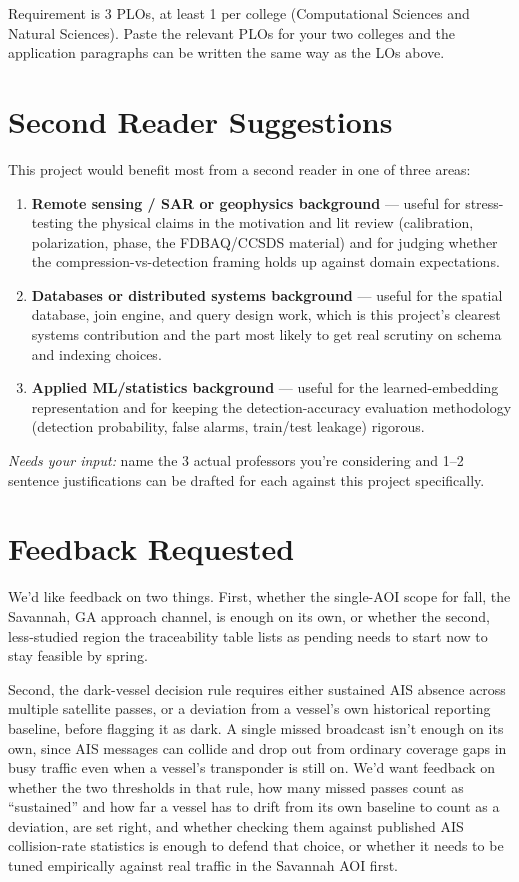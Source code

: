 \documentclass[11pt]{article}
\begin{document}
Requirement is 3 PLOs, at least 1 per college (Computational Sciences and Natural Sciences). Paste the relevant PLOs for your two colleges and the application paragraphs can be written the same way as the LOs above.

\section{Second Reader Suggestions}

This project would benefit most from a second reader in one of three areas:

\begin{enumerate}[leftmargin=*]
\item \textbf{Remote sensing / SAR or geophysics background} --- useful for stress-testing the physical claims in the motivation and lit review (calibration, polarization, phase, the FDBAQ/CCSDS material) and for judging whether the compression-vs-detection framing holds up against domain expectations.
\item \textbf{Databases or distributed systems background} --- useful for the spatial database, join engine, and query design work, which is this project's clearest systems contribution and the part most likely to get real scrutiny on schema and indexing choices.
\item \textbf{Applied ML/statistics background} --- useful for the learned-embedding representation and for keeping the detection-accuracy evaluation methodology (detection probability, false alarms, train/test leakage) rigorous.
\end{enumerate}

\textit{Needs your input:} name the 3 actual professors you're considering and 1--2 sentence justifications can be drafted for each against this project specifically.

\section{Feedback Requested}

We'd like feedback on two things. First, whether the single-AOI scope for fall, the Savannah, GA approach channel, is enough on its own, or whether the second, less-studied region the traceability table lists as pending needs to start now to stay feasible by spring.

Second, the dark-vessel decision rule requires either sustained AIS absence across multiple satellite passes, or a deviation from a vessel's own historical reporting baseline, before flagging it as dark. A single missed broadcast isn't enough on its own, since AIS messages can collide and drop out from ordinary coverage gaps in busy traffic even when a vessel's transponder is still on. We'd want feedback on whether the two thresholds in that rule, how many missed passes count as ``sustained'' and how far a vessel has to drift from its own baseline to count as a deviation, are set right, and whether checking them against published AIS collision-rate statistics is enough to defend that choice, or whether it needs to be tuned empirically against real traffic in the Savannah AOI first.
\end{document}
